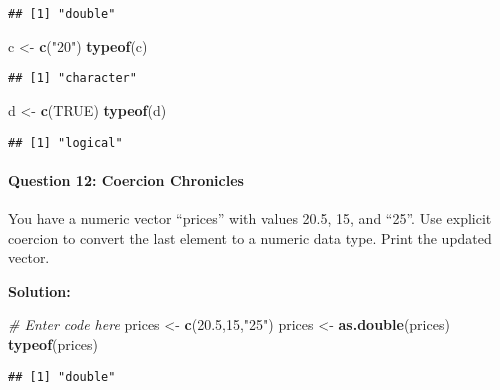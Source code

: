 \documentclass[
]{article}
\newenvironment{Shaded}{\begin{snugshade}}{\end{snugshade}}
\newcommand{\CommentTok}[1]{\textcolor[rgb]{0.56,0.35,0.01}{\textit{#1}}}
\newcommand{\ConstantTok}[1]{\textcolor[rgb]{0.56,0.35,0.01}{#1}}
\newcommand{\DecValTok}[1]{\textcolor[rgb]{0.00,0.00,0.81}{#1}}
\newcommand{\FloatTok}[1]{\textcolor[rgb]{0.00,0.00,0.81}{#1}}
\newcommand{\FunctionTok}[1]{\textcolor[rgb]{0.13,0.29,0.53}{\textbf{#1}}}
\newcommand{\NormalTok}[1]{#1}
\newcommand{\OtherTok}[1]{\textcolor[rgb]{0.56,0.35,0.01}{#1}}
\newcommand{\StringTok}[1]{\textcolor[rgb]{0.31,0.60,0.02}{#1}}
\begin{document}
\begin{verbatim}
## [1] "double"
\end{verbatim}

\begin{Shaded}
\begin{Highlighting}[]
\NormalTok{c }\OtherTok{\textless{}{-}} \FunctionTok{c}\NormalTok{(}\StringTok{"20"}\NormalTok{)}
\FunctionTok{typeof}\NormalTok{(c)}
\end{Highlighting}
\end{Shaded}

\begin{verbatim}
## [1] "character"
\end{verbatim}

\begin{Shaded}
\begin{Highlighting}[]
\NormalTok{d }\OtherTok{\textless{}{-}} \FunctionTok{c}\NormalTok{(}\ConstantTok{TRUE}\NormalTok{)}
\FunctionTok{typeof}\NormalTok{(d)}
\end{Highlighting}
\end{Shaded}

\begin{verbatim}
## [1] "logical"
\end{verbatim}

\hypertarget{question-12-coercion-chronicles}{%
\paragraph{Question 12: Coercion
Chronicles}\label{question-12-coercion-chronicles}}

You have a numeric vector ``prices'' with values 20.5, 15, and ``25''.
Use explicit coercion to convert the last element to a numeric data
type. Print the updated vector.

\textbf{Solution:}

\begin{Shaded}
\begin{Highlighting}[]
\CommentTok{\# Enter code here}
\NormalTok{prices }\OtherTok{\textless{}{-}} \FunctionTok{c}\NormalTok{(}\FloatTok{20.5}\NormalTok{,}\DecValTok{15}\NormalTok{,}\StringTok{"25"}\NormalTok{)}
\NormalTok{prices }\OtherTok{\textless{}{-}} \FunctionTok{as.double}\NormalTok{(prices)}
\FunctionTok{typeof}\NormalTok{(prices)}
\end{Highlighting}
\end{Shaded}

\begin{verbatim}
## [1] "double"
\end{verbatim}
\end{document}
